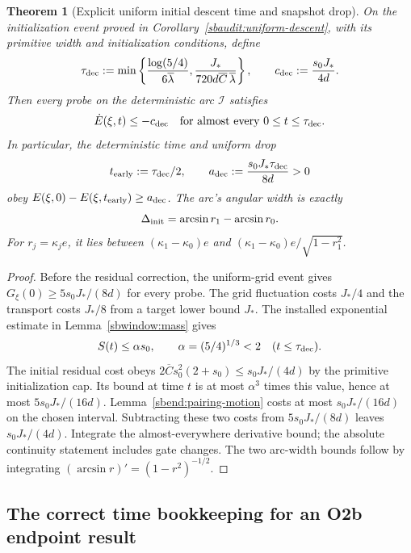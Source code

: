 \documentclass{article} %
\theoremstyle{plain}
\newtheorem{theorem}{Theorem}[section]
\theoremstyle{definition}
\theoremstyle{remark}
\begin{document}
\begin{theorem}[Explicit uniform initial descent time and snapshot drop]
\label{sbend:descent-clock}
On the initialization event proved in
Corollary~\ref{sbaudit:uniform-descent}, with its primitive width and
initialization conditions, define
\begin{equation}\label{sbend:tau-dec}
 \tau_{\rm dec}:=\min\left\{
 \frac{\log(5/4)}{6\overline\lambda},
 \frac{J_*}{720d\overline C\,\overline\lambda}\right\},
 \qquad c_{\rm dec}:=\frac{s_0J_*}{4d}.
\end{equation}
Then every probe on the deterministic arc $\mathcal I$ satisfies
\[
 \dot E(\xi,t)\le-c_{\rm dec}
 \quad\text{for almost every }0\le t\le\tau_{\rm dec}.
\]
In particular, the deterministic time and uniform drop
\begin{equation}\label{sbend:early-drop}
 t_{\rm early}:=\tau_{\rm dec}/2,\qquad
 a_{\rm dec}:=\frac{s_0J_*\tau_{\rm dec}}{8d}>0
\end{equation}
obey $E(\xi,0)-E(\xi,t_{\rm early})\ge a_{\rm dec}$.
The arc's angular width is exactly
\[
 \Delta_{\rm init}=\arcsin r_1-\arcsin r_0.
\]
For $r_j=\kappa_je$, it lies between
$(\kappa_1-\kappa_0)e$ and
$(\kappa_1-\kappa_0)e/\sqrt{1-r_1^2}$.
\end{theorem}
\begin{proof}
Before the residual correction, the uniform-grid event gives
$G_\xi(0)\ge5s_0J_*/(8d)$ for every probe. The grid fluctuation costs
$J_*/4$ and the transport costs $J_*/8$ from a target lower bound $J_*$.
The installed exponential estimate in Lemma~\ref{sbwindow:mass} gives
\[
 S(t)\le\alpha s_0,\qquad \alpha=(5/4)^{1/3}<2
 \quad(t\le\tau_{\rm dec}).
\]
The initial residual cost obeys
$2\overline C s_0^2(2+s_0)\le s_0J_*/(4d)$ by the primitive
initialization cap. Its bound at time $t$ is at most $\alpha^3$ times
this value, hence at most $5s_0J_*/(16d)$.
Lemma~\ref{sbend:pairing-motion} costs at most $s_0J_*/(16d)$ on the
chosen interval. Subtracting these two costs from $5s_0J_*/(8d)$ leaves
$s_0J_*/(4d)$. Integrate the almost-everywhere derivative bound; the
absolute continuity statement includes gate changes. The two arc-width
bounds follow by integrating $(\arcsin r)'=(1-r^2)^{-1/2}$.
\end{proof}

\subsection{The correct time bookkeeping for an O2b endpoint result}
\end{document}
